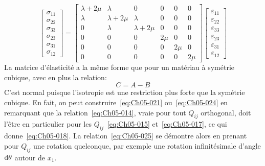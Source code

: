 \begin{equation}
    \begin{bmatrix}
        \sigma_{11}\\
        \sigma_{22}\\
        \sigma_{33}\\
        \sigma_{23}\\
        \sigma_{31}\\
        \sigma_{12}
    \end{bmatrix}
    =
    \begin{bmatrix}
        \lambda+2\mu & \lambda      & 0            & 0    & 0    & 0 \\
        \lambda      & \lambda+2\mu & \lambda      & 0    & 0    & 0 \\
        0            & \lambda      & \lambda+2\mu & 0    & 0    & 0 \\
        0            & 0            & 0            & 2\mu & 0    & 0 \\
        0            & 0            & 0            & 0    & 2\mu & 0 \\
        0            & 0            & 0            & 0    & 0    & 2\mu
    \end{bmatrix}
    \begin{bmatrix}
        \varepsilon_{11}\\
        \varepsilon_{22}\\
        \varepsilon_{33}\\
        \varepsilon_{23}\\
        \varepsilon_{31}\\
        \varepsilon_{12}
    \end{bmatrix}
    \label{eq:Ch05-024}
\end{equation}
La matrice d'élasticité a la même forme que pour un matériau à symétrie cubique, avec en plus la relation: 
\begin{equation}
	C = A-B
	\label{eq:Ch05-025}
\end{equation}
C'est normal puisque l'isotropie est une restriction plus forte que la symétrie cubique.
En fait, on peut construire~\eqref{eq:Ch05-021} ou~\eqref{eq:Ch05-024} en remarquant que la relation~\eqref{eq:Ch05-014}, vraie pour tout $Q_{ij}$ orthogonal, doit l'être en particulier pour les $Q_{ij}$~\eqref{eq:Ch05-015} et~\eqref{eq:Ch05-017}, ce qui donne~\eqref{eq:Ch05-018}.
La relation~\eqref{eq:Ch05-025} se démontre alors en prenant pour $Q_{ij}$ une rotation quelconque, par exemple une rotation infinitésimale d'angle $\mathop{\mathrm{{}d}}\mathopen{} \theta$ autour de $x_1$. 

